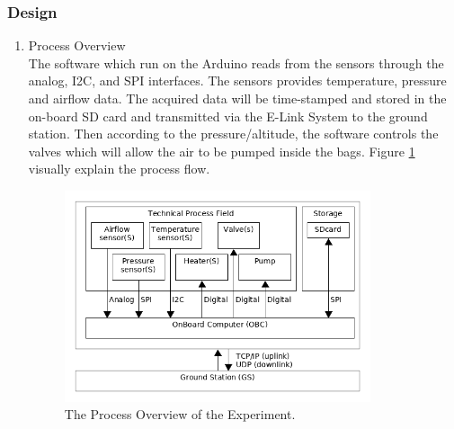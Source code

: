 \subsubsection{Design} \label{sec:4.8.2}
\begin{enumerate}[label=(\alph*)]
\item{Process Overview}\\
The software which run on the Arduino reads from the sensors through the analog, I2C, and SPI interfaces. The sensors provides temperature, pressure and airflow data. The acquired data will be time-stamped and stored in the on-board SD card and transmitted via the E-Link System to the ground station. Then according to the pressure/altitude, the software controls the valves which will allow the air to be pumped inside the bags. Figure \ref{processOverview} visually explain the process flow.

\begin{figure}[H]
    \centering
    \includegraphics[width=0.85\textwidth]{4-experiment-design/img/Process-overview-V0-3.png}
    \caption{The Process Overview of the Experiment.}
    \label{processOverview}
\end{figure}


\end{enumerate}
